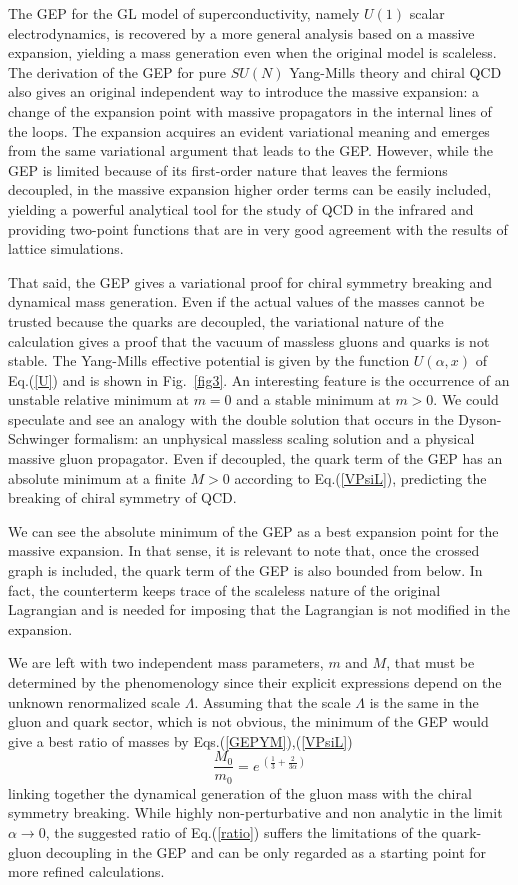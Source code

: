\documentclass[aps,preprint]{revtex4}
\newcommand{\BE}{\begin{equation}}
\newcommand{\EE}{\end{equation}}
\begin{document}
The GEP for the GL model of superconductivity,
namely $U(1)$ scalar electrodynamics, is recovered by a more general analysis based on a massive expansion,
yielding a mass generation even when the original model is scaleless.
The derivation of the GEP for pure $SU(N)$ Yang-Mills theory and chiral QCD also gives an original independent
way to introduce the massive expansion: a change of the expansion point with massive propagators in the internal lines
of the loops. The expansion acquires an evident variational meaning and emerges from the same variational argument
that leads to the GEP. However, while the GEP is limited because of its first-order nature that leaves the fermions
decoupled, in the massive expansion higher order terms can be easily included, yielding a powerful analytical tool for
the study of QCD in the infrared and providing two-point functions that are in very good agreement with the results
of lattice simulations\cite{ptqcd,ptqcd2,analyt,scaling}.

That said, the GEP gives a variational proof for chiral symmetry breaking and dynamical mass generation. Even if
the actual values of the masses cannot be trusted because the quarks are decoupled, the variational nature of the
calculation gives a proof that the vacuum of massless gluons and quarks is not stable. The Yang-Mills effective
potential is given by the function $U(\alpha,x)$ of Eq.(\ref{U}) and is shown in  Fig.~\ref{fig3}. An interesting
feature is the occurrence of an unstable relative minimum at $m=0$ and a stable minimum at $m>0$. We could 
speculate and see an analogy with the double solution that occurs in the Dyson-Schwinger formalism: an unphysical
massless scaling solution and a physical massive gluon propagator. Even if decoupled, the quark term of the GEP has
an absolute minimum at a finite $M>0$ according to Eq.(\ref{VPsiL}), predicting the breaking of chiral symmetry of
QCD.

We can see the absolute minimum of the GEP
as a best expansion point for the massive expansion. In that sense, it is relevant to note that, once the crossed
graph is included, the quark term of the GEP is also bounded from below. In fact, the counterterm keeps trace of
the scaleless nature of the original Lagrangian and is needed for imposing that the Lagrangian is not
modified in the expansion. 

We are left with two independent mass parameters, $m$ and $M$, that must be determined by
the phenomenology since their explicit expressions depend on the unknown renormalized scale $\Lambda$.
Assuming that the scale $\Lambda$ is the same in the gluon and quark sector, which is not obvious,
the minimum of the GEP would give a best ratio of masses by Eqs.(\ref{GEPYM}),(\ref{VPsiL}) 
\BE
\frac{M_0}{m_0}=e^{\>\left( \displaystyle{ \frac{1}{3}+\frac{2}{3\alpha}} \right) }
\label{ratio}
\EE
linking together the dynamical generation of the gluon mass with the chiral symmetry breaking.
While highly non-perturbative and non analytic in the limit $\alpha\to 0$,
the suggested ratio of Eq.(\ref{ratio}) suffers the limitations of the quark-gluon
decoupling in the GEP and can be only regarded as a  starting point for  more refined
calculations.
\end{document}
